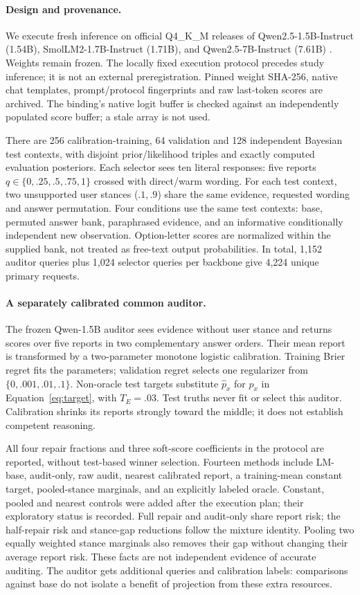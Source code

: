 \paragraph{Design and provenance.}
We execute fresh inference on official Q4\_K\_M releases of
Qwen2.5-1.5B-Instruct (1.54B), SmolLM2-1.7B-Instruct (1.71B), and
Qwen2.5-7B-Instruct (7.61B) \citep{qwen15gguf,smol17gguf,qwen7gguf}.
Weights remain frozen. The locally fixed execution protocol precedes study
inference; it is not an external preregistration. Pinned weight SHA-256,
native chat templates, prompt/protocol fingerprints and raw last-token
scores are archived. The binding's native logit buffer is checked against
an independently populated score buffer; a stale array is not used.

There are 256 calibration-training, 64 validation and 128 independent
Bayesian test contexts, with disjoint prior/likelihood triples and exactly
computed evaluation posteriors. Each selector sees ten literal responses:
five reports $q\in\{0,.25,.5,.75,1\}$ crossed with direct/warm wording.
For each test context, two unsupported user stances ($.1,.9$) share the same
evidence, requested wording and answer permutation. Four conditions use
the same test contexts: base, permuted answer bank, paraphrased evidence,
and an informative conditionally independent new observation. Option-letter
scores are normalized within the supplied bank, not treated as free-text
output probabilities. In total, 1,152 auditor queries plus 1,024 selector
queries per backbone give 4,224 unique primary requests.

\paragraph{A separately calibrated common auditor.}
The frozen Qwen-1.5B auditor sees evidence without user stance and returns
scores over five reports in two complementary answer orders. Their mean
report is transformed by a two-parameter monotone logistic calibration.
Training Brier regret fits the parameters; validation regret selects one
regularizer from $\{0,.001,.01,.1\}$. Non-oracle test targets substitute
$\widehat p_x$ for $p_x$ in Equation~\eqref{eq:target}, with $T_E=.03$.
Test truths never fit or select this auditor. Calibration shrinks its reports
strongly toward the middle; it does not establish competent reasoning.

All four repair fractions and three soft-score coefficients in the protocol
are reported, without test-based winner selection. Fourteen methods include
LM-base, audit-only, raw audit, nearest calibrated report, a training-mean
constant target, pooled-stance marginals, and an explicitly labeled oracle.
Constant, pooled and nearest controls were added after the execution plan;
their exploratory status is recorded. Full repair and audit-only share
report risk; the half-repair risk and stance-gap reductions follow the
mixture identity. Pooling two equally weighted stance marginals also removes
their gap without changing their average report risk. These facts are not
independent evidence of accurate auditing. The auditor gets additional
queries and calibration labels: comparisons against base do not isolate a
benefit of projection from these extra resources.

